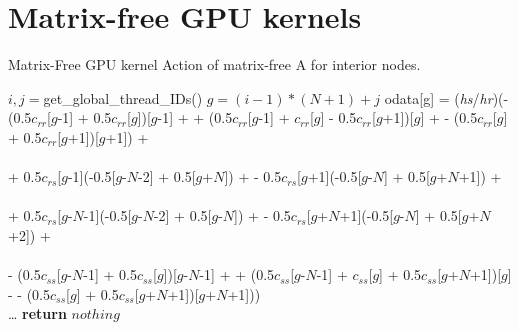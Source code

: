 \section{Matrix-free GPU kernels}
\setcounter{algorithm}{1}
\begin{algorithm*}
\caption{Matrix-Free GPU kernel Action of matrix-free A for interior nodes.}\label{alg:mfA-1}
\algrenewcommand{}
\begin{algorithmic}
    \State  $i, j = $get\_global\_thread\_IDs()
    \State $g = (i-1) * (N+1) + j$
     
        \State odata[g] = (\emph{hs}/\emph{hr})(- (0.5$c_{rr}$[$g$-1] + 0.5$c_{rr}$[$g$])[$g$-1] +
        \State \hspace{25mm}    + (0.5$c_{rr}$[$g$-1]  +  $c_{rr}$[$g$] - 0.5$c_{rr}$[$g$+1])[$g$] + 
        \State  \hspace{25mm}     - (0.5$c_{rr}$[$g$] + 0.5$c_{rr}$[$g$+1])[$g$+1]) + \\ \\
        \State \hspace{25mm} + 0.5$c_{rs}$[$g$-1](-0.5[$g$-$N$-2] + 0.5[$g$+$N$]) + 
        \State   \hspace{25mm} - 0.5$c_{rs}$[$g$+1](-0.5[$g$-$N$] + 0.5[$g$+$N$+1]) + \\ \\
        \State  \hspace{25mm} + 0.5$c_{rs}$[$g$-$N$-1](-0.5[$g$-$N$-2] + 0.5[$g$-$N$]) + 
        \State  \hspace{25mm} - 0.5$c_{rs}$[$g$+$N$+1](-0.5[$g$-$N$] + 0.5[$g$+$N$+2]) + \\ \\
        \State  \hspace{25mm} - (0.5$c_{ss}$[$g$-$N$-1] + 0.5$c_{ss}$[$g$])[$g$-$N$-1] + 
        \State  \hspace{25mm} + (0.5$c_{ss}$[$g$-$N$-1]  + $c_{ss}$[$g$] + 0.5$c_{ss}$[$g$+$N$+1])[$g$] - 
        \State  \hspace{25mm}     - (0.5$c_{ss}$[$g$] + 0.5$c_{ss}$[$g$+$N$+1])[$g$+$N$+1])) \\
    \EndIf
    \State  \dots {}
    \State \textbf{return} $nothing $ 
\EndProcedure
\end{algorithmic}
\end{algorithm*}


